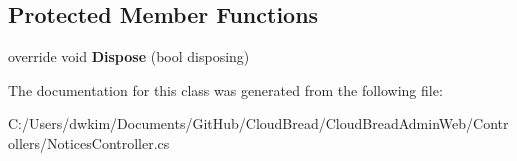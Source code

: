 \subsection*{Protected Member Functions}
\begin{DoxyCompactItemize}
\item 
override void {\bfseries Dispose} (bool disposing)\hypertarget{class_cloud_bread_admin_web_1_1_controllers_1_1_notices_controller_a99e5699b2799c3384ff56853e90f9296}{}\label{class_cloud_bread_admin_web_1_1_controllers_1_1_notices_controller_a99e5699b2799c3384ff56853e90f9296}

\end{DoxyCompactItemize}


The documentation for this class was generated from the following file\+:\begin{DoxyCompactItemize}
\item 
C\+:/\+Users/dwkim/\+Documents/\+Git\+Hub/\+Cloud\+Bread/\+Cloud\+Bread\+Admin\+Web/\+Controllers/Notices\+Controller.\+cs\end{DoxyCompactItemize}

